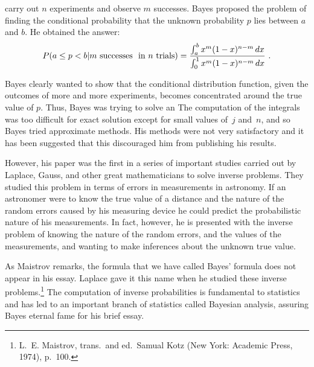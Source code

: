 carry out
$n$ experiments and observe $m$ successes.  Bayes proposed the problem of finding
the conditional probability that the unknown probability $p$ lies between $a$
and $b$.  He obtained the answer:
$$
P(a \leq p < b | m {\mbox{\,\,successes\,\, in}}\,\,n \,\,{\mbox{trials}}) 
= \frac {\int_a^b x^m(1 - x)^{n - m}\,dx}{\int_0^1 x^m(1 - x)^{n - m}\,dx}\ .
$$
\par
{}  Bayes clearly
wanted to show that the conditional distribution function, given the outcomes of
more and more experiments, becomes concentrated around the true value of $p$. 
Thus, Bayes was trying to solve an   The computation of
the integrals was too difficult for exact solution except for small values
of~$j$ and~$n$, and so Bayes tried approximate methods.  His methods were not
very satisfactory and it has been suggested that this discouraged him from
publishing his results.
\par
However, his paper was the first in a series of important studies carried out
by Laplace, Gauss, and other great mathematicians to solve inverse problems. 
They studied this problem in terms of errors in measurements in astronomy.  If
an astronomer were to know the true value of a distance and the nature of the
random errors caused by his measuring device he could predict the probabilistic
nature of his measurements.  In fact, however, he is presented with the inverse
problem of knowing the nature of the random errors, and the values of the
measurements, and wanting to make inferences about the unknown true value.
\par
As Maistrov remarks, the formula that we have called Bayes' formula does not
appear in his essay.  Laplace gave it this name when he studied these inverse
problems.\footnote{L.~E. Maistrov,  trans.~and ed.~Samual Kotz (New York: Academic Press, 1974), p.~100.}
The computation of inverse probabilities is fundamental to statistics and has
led to an important branch of statistics called Bayesian analysis, assuring
Bayes eternal fame for his brief essay.

